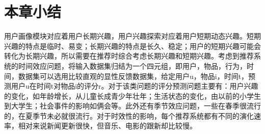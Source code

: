 	\section{本章小结}
	用户画像模块对应着用户长期兴趣，用户兴趣探索对应着用户短期动态兴趣。短期兴趣的特点是临时、易变；长期兴趣的特点是长久、稳定；用户的短期兴趣可能会转化为长期兴趣，所以需要在推荐时综合考虑长期兴趣和短期兴趣。考虑到推荐系统的时间效应问题，将输入数据集归结为一个四元组，即{用户，物品，行为，时间}，数据集可以选用比较直观的显性反馈数据集，给定用户u，物品i，时间t，预测用户u在时间t对物品i的评分r。对于该类问题的评分预测问题主要有：用户兴趣的变化，如年龄增长，从儿童长成青少年壮年；生活状态的变化，由以前的小学生到大学生；社会事件的影响如俩会等。此外还有季节效应问题，一些在春季很流行的，在夏季节未必就很流行。对于时效性的影响，每个推荐系统都有不同的演化速率，相对来说新闻更新很快，但音乐、电影的跟新却比较慢。